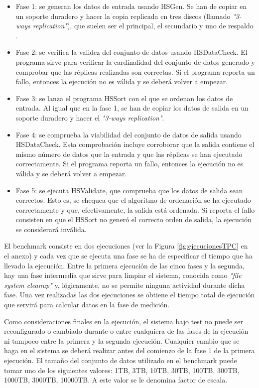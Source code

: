 \documentclass[10pt]{article}
\begin{document}
		\begin{itemize}
			\item Fase 1: se generan los datos de entrada usando HSGen. Se han de copiar en un soporte duradero y hacer la copia replicada en tres discos (llamado \textit{"3-ways replication"}), que suelen ser el principal, el secundario y uno de respaldo \cite{replication}.
			\item Fase 2: se verifica la validez del conjunto de datos usando HSDataCheck. El programa sirve para verificar la cardinalidad del conjunto de datos generado y comprobar que las réplicas realizadas son correctas. Si el programa reporta un fallo, entonces la ejecución no es válida y se deberá volver a empezar.
			\item Fase 3: se lanza el programa HSSort con el que se ordenan los datos de entrada. Al igual que en la fase 1, se han de copiar los datos de salida en un soporte duradero y hacer el \textit{"3-ways replication"}.
			\item Fase 4: se comprueba la viabilidad del conjunto de datos de salida usando HSDataCheck. Esta comprobación incluye corroborar que la salida contiene el mismo número de datos que la entrada y que las réplicas se han ejecutado correctamente. Si el programa reporta un fallo, entonces la ejecución no es válida y se deberá volver a empezar.
			\item Fase 5: se ejecuta HSValidate, que comprueba que los datos de salida sean correctos. Esto es, se chequea que el algoritmo de ordenación se ha ejecutado correctamente y que, efectivamente, la salida está ordenada. Si reporta el fallo consisten en que el HSSort no generó el correcto orden de salida, la ejecución se considerará inválida.
		\end{itemize}
		
		El benchmark consiste en dos ejecuciones (ver la Figura \ref{fig:ejecucionesTPC} en el anexo) y cada vez que se ejecuta una fase se ha de especificar el tiempo que ha llevado la ejecución. Entre la primera ejecución de las cinco fases y la segunda, hay una fase intermedia que sirve para limpiar el sistema, conocida como \textit{"file system cleanup"} y, lógicamente, no se permite ninguna actividad durante dicha fase. Una vez realizadas las dos ejecuciones se obtiene el tiempo total de ejecución que servirá para calcular datos en la fase de medición.
			
		Como consideraciones finales en la ejecución, el sistema bajo test no puede ser reconfigurado o cambiado durante o entre cualquiera de las fases de la ejecución ni tampoco entre la primera y la segunda ejecución. Cualquier cambio que se haga en el sistema se deberá realizar antes del comienzo de la fase 1 de la primera ejecución. El tamaño del conjunto de datos utilizado en el benchmark puede tomar uno de los siguientes valores: 1TB, 3TB, 10TB, 30TB, 100TB, 300TB, 1000TB, 3000TB, 10000TB. A este valor se le denomina factor de escala.
	
\end{document}

